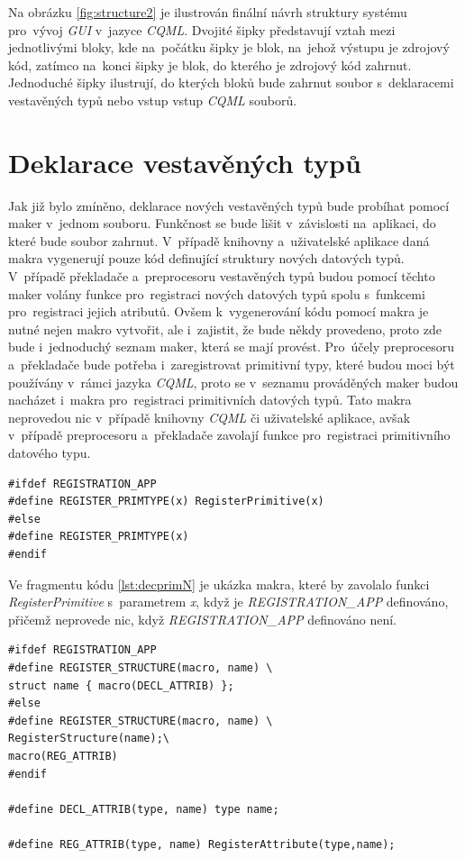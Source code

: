 \documentclass[11pt,twoside,a4paper]{book}
\begin{document}
Na obrázku \ref{fig:structure2} je ilustrován finální návrh struktury systému pro~vývoj \textit{GUI} v~jazyce \textit{CQML}. Dvojité šipky představují vztah mezi jednotlivými bloky, kde na~počátku šipky je blok, na~jehož výstupu je zdrojový kód, zatímco na~konci šipky je blok, do kterého je zdrojový kód zahrnut. Jednoduché šipky ilustrují, do kterých bloků bude zahrnut soubor s~deklaracemi vestavěných typů nebo vstup vstup \textit{CQML} souborů.

\section{\label{SEC:macN}Deklarace vestavěných typů}
Jak již bylo zmíněno, deklarace nových vestavěných typů bude probíhat pomocí maker v~jednom souboru. Funkčnost se bude lišit v~závislosti na~aplikaci, do které bude soubor zahrnut. V~případě knihovny a~uživatelské aplikace daná makra vygenerují pouze kód definující struktury nových datových typů. V~případě překladače a~preprocesoru vestavěných typů budou pomocí těchto maker volány funkce pro~registraci nových datových typů spolu s~funkcemi pro~registraci jejich atributů. Ovšem k~vygenerování kódu pomocí makra je nutné nejen makro vytvořit, ale i~zajistit, že bude někdy provedeno, proto zde bude i~jednoduchý seznam maker, která se mají provést. Pro~účely preprocesoru a~překladače bude potřeba i~zaregistrovat primitivní typy, které budou moci být používány v~rámci jazyka \textit{CQML}, proto se v~seznamu prováděných maker budou nacházet i~makra pro~registraci primitivních datových typů. Tato makra neprovedou nic v~případě knihovny \textit{CQML} či uživatelské aplikace, avšak v~případě preprocesoru a~překladače zavolají funkce pro~registraci primitivního datového typu.

\begin{lstlisting}[frame=single,caption=Makro registrující datový typ\, v~případě\, že je definováno jiné makro. ,label=lst:decprimN]
#ifdef REGISTRATION_APP
#define REGISTER_PRIMTYPE(x) RegisterPrimitive(x)
#else
#define REGISTER_PRIMTYPE(x)
#endif
\end{lstlisting}
Ve fragmentu kódu \ref{lst:decprimN} je ukázka makra, které by zavolalo funkci \textit{RegisterPrimitive} s~parametrem \textit{x}, když je \textit{REGISTRATION\_APP} definováno, přičemž neprovede nic, když \textit{REGISTRATION\_APP} definováno není.


\begin{lstlisting}[frame=single,caption=Makro\, které registruje strukturu nebo vypíše její deklaraci\, v~závislosti na~jiném makru. ,label=lst:decN]
#ifdef REGISTRATION_APP
#define REGISTER_STRUCTURE(macro, name) \
struct name { macro(DECL_ATTRIB) };
#else
#define REGISTER_STRUCTURE(macro, name) \
RegisterStructure(name);\
macro(REG_ATTRIB) 
#endif

#define DECL_ATTRIB(type, name) type name;

#define REG_ATTRIB(type, name) RegisterAttribute(type,name);
\end{lstlisting}
  
\end{document}
